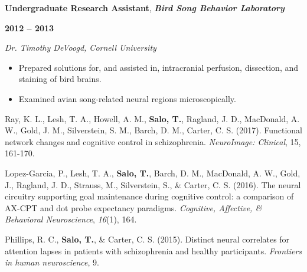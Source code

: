 \documentclass[10pt]{article}
\newcommand{\sectionstyle}{\LARGE \fontfamily{pcr}\selectfont}
\begin{document}
\bigskip

\begin{minipage}[t]{.85\linewidth}
\flushleft
\noindent
\textbf{Undergraduate Research Assistant}, \emph{\textbf{Bird Song Behavior
Laboratory}}
\end{minipage}
\hfill
\begin{minipage}[t]{.15\linewidth}
\flushright
\noindent
\textsc{\textbf{2012 -- 2013}}
\end{minipage}

\emph{Dr. Timothy DeVoogd, Cornell University}

\begin{itemize}[noitemsep, nolistsep]
\item
  Prepared solutions for, and assisted in, intracranial perfusion,
  dissection, and staining of bird brains.
\item
  Examined avian song-related neural regions microscopically.
\end{itemize}

\newpage

\begin{center}\sectionstyle{PUBLICATIONS}\end{center}

\begin{hangparas}{.25in}{1}
Ray, K. L., Lesh, T. A., Howell, A. M., \textbf{Salo, T.}, Ragland, J. D., MacDonald, A. W., Gold, J. M., Silverstein, S. M., Barch, D. M., Carter, C. S. (2017). Functional network changes and cognitive control in schizophrenia. \emph{NeuroImage: Clinical}, 15, 161-170.

\bigskip

Lopez-Garcia, P., Lesh, T. A., \textbf{Salo, T.}, Barch, D. M., MacDonald, A. W., Gold, J., Ragland, J. D., Strauss, M., Silverstein, S., \& Carter, C. S. (2016). The neural circuitry supporting goal maintenance during cognitive control: a comparison of AX-CPT and dot probe expectancy paradigms. \emph{Cognitive, Affective, \& Behavioral Neuroscience}, \emph{16}(1), 164.

\bigskip

Phillips, R. C., \textbf{Salo, T.}, \& Carter, C. S. (2015). Distinct neural correlates for attention lapses in patients with schizophrenia and healthy participants. \emph{Frontiers in human neuroscience}, 9.
\end{hangparas}

\bigskip

\begin{center}\sectionstyle{PRESENTATIONS}\end{center}
\end{document}
